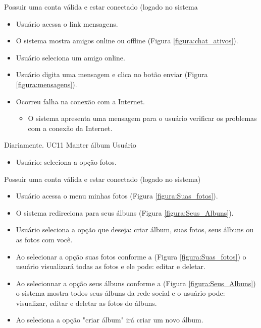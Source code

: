  {Possuir uma conta válida e estar conectado (logado no sistema}
{}
{
\begin{itemize}
	\item Usuário acessa o link mensagens.
	\item O sistema mostra amigos online ou offline (Figura \ref{figura:chat_ativos}).
	\item Usuário seleciona um amigo online.
	\item Usuário digita uma mensagem e clica no botão enviar (Figura \ref{figura:mensagens}).
\end{itemize}
}
{
\begin{itemize}
	\item Ocorreu falha na conexão com a Internet.
	\begin{itemize}
	\item O sistema apresenta uma mensagem para o usuário verificar os problemas com a conexão da Internet.
	\end{itemize}
\end{itemize}
}
{Diariamente.}
{
}
\casoDeUso
{UC11}
{Manter álbum}
{Usuário}
{
\begin{itemize}
	\item Usuário: seleciona a opção fotos.
	
\end{itemize}

}
 {Possuir uma conta válida e estar conectado (logado no sistema)}
{}
{
\begin{itemize}
	\item Usuário acessa o menu minhas fotos (Figura \ref{figura:Suas_fotos}).
	\item O sistema redireciona para seus álbuns (Figura \ref{figura:Seus_Albuns}).
	\item Usuário seleciona a opção que deseja: criar álbum, suas fotos, seus álbuns ou as fotos com você.
	
\end{itemize}
}
{
\begin{itemize}
	\item Ao selecionar a opção suas fotos conforme a (Figura \ref{figura:Suas_fotos}) o usuário visualizará todas as fotos e ele pode: editar e deletar.
	\item Ao selecionnar a opção seus álbuns conforme a (Figura \ref{figura:Seus_Albuns}) o sistema mostra todos seus álbuns da rede social e o usuário pode: visualizar, editar e deletar as fotos do álbuns.
	\item Ao seleciona a opção "criar álbum" irá criar um novo álbum.
	
\end{itemize}
}
